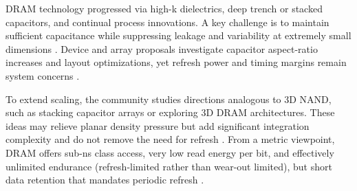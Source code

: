 DRAM technology progressed via high-k dielectrics, deep trench or stacked capacitors, and continual process innovations. A key challenge is to maintain sufficient capacitance while suppressing leakage and variability at extremely small dimensions \cite{choi2022}. Device and array proposals investigate capacitor aspect-ratio increases and layout optimizations, yet refresh power and timing margins remain system concerns \cite{kim2021_dram}.

To extend scaling, the community studies directions analogous to 3D NAND, such as stacking capacitor arrays or exploring 3D DRAM architectures. These ideas may relieve planar density pressure but add significant integration complexity and do not remove the need for refresh \cite{iedm2023_dram}. From a metric viewpoint, DRAM offers sub-ns class access, very low read energy per bit, and effectively unlimited endurance (refresh-limited rather than wear-out limited), but short data retention that mandates periodic refresh \cite{choi2022}.
